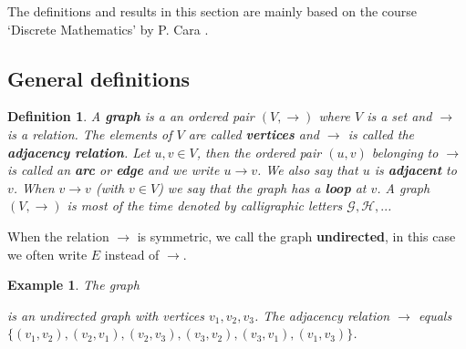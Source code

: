 \documentclass[a4paper,11pt]{report}
\newtheorem{example}[theorem]{Example}
\newtheorem{definition}[theorem]{Definition}
\begin{document}
The definitions and results in this section are mainly based on the course 
`Discrete Mathematics' by P. Cara \cite{cara}. 


\subsection{General definitions}
\begin{definition}\label{defgraf}
  A \textbf{graph} is a an ordered pair $(V,\rightarrow)$ where $V$ is a set and $\to$ is a relation. The elements of $V$ are called
 \textbf{vertices} and $\rightarrow$ is called the \textbf{adjacency relation}. Let $u, v \in V$, then the ordered pair 
 $(u, v)$ belonging to $\to$ is called an \textbf{arc} or \textbf{edge} and we write $u \rightarrow v$. We also
 say that $u$ is \textbf{adjacent} to $v$.  When $v \to v$ (with $v \in V$) we say that the graph has a 
 \textbf{loop} at $v$. A graph $(V,\rightarrow)$ is 
  most of the time denoted by calligraphic letters $\mathscr{G}, 
  \mathscr{H},..$.   \end{definition}
 When the relation $\rightarrow$ is symmetric, 
 we call the graph \textbf{undirected}, in this case we often write $E$ instead 
 of $\rightarrow$.  
 
 
 \begin{example}\label{simpelegraf}
  The graph
  \begin{center}

\end{center}
is an undirected graph with vertices $v_1, v_2, v_3$. The adjacency 
relation $\to$ equals \\$\{(v_1,v_2), (v_2,v_1), (v_2, v_3), (v_3,v_2), (v_3, v_1), 
(v_1,v_3)\}$.
\end{example}
\end{document}
